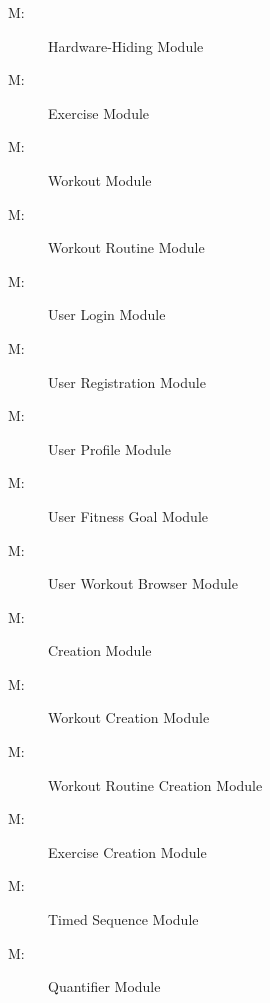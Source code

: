 \documentclass[12pt, titlepage]{article}
\newcounter{mnum}
\newcommand{\mthemnum}{M\themnum}
\begin{document}
\begin{description}
\item [ \mthemnum \label{mHH}:] Hardware-Hiding Module
\item [ \mthemnum \label{mExercise}:] Exercise Module
\item [ \mthemnum \label{mWorkout}:] Workout Module
\item [ \mthemnum \label{mWR}:] Workout Routine Module
\item [ \mthemnum \label{mUL}:] User Login Module
\item [ \mthemnum \label{mUR}:] User Registration Module
\item [ \mthemnum \label{mUP}:] User Profile Module
\item [ \mthemnum \label{mUFG}:] User Fitness Goal Module
\item [ \mthemnum \label{mWB}:] User Workout Browser Module
\item [ \mthemnum \label{mCreation}:] Creation Module
\item [ \mthemnum \label{mWC}:] Workout Creation Module
\item [ \mthemnum \label{mWRC}:] Workout Routine Creation Module
\item [ \mthemnum \label{mEC}:] Exercise Creation Module
\item [ \mthemnum \label{mTS}:] Timed Sequence Module
\item [ \mthemnum \label{mQuantifier}:] Quantifier Module
\end{description}
\end{document}
